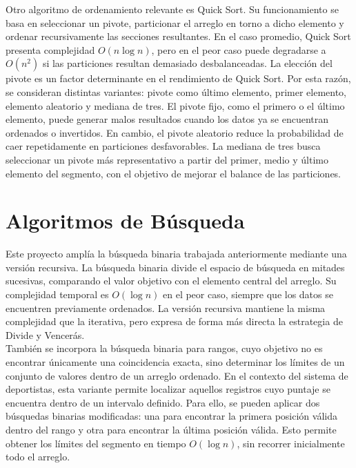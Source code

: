 Otro algoritmo de ordenamiento relevante es Quick Sort. Su funcionamiento se basa en seleccionar un pivote, particionar el arreglo en torno a dicho elemento y ordenar recursivamente las secciones resultantes. En el caso promedio, Quick Sort presenta complejidad $O(n \log n)$, pero en el peor caso puede degradarse a $O(n^2)$ si las particiones resultan demasiado desbalanceadas. La elección del pivote es un factor determinante en el rendimiento de Quick Sort. Por esta razón, se consideran distintas variantes: pivote como último elemento, primer elemento, elemento aleatorio y mediana de tres. El pivote fijo, como el primero o el último elemento, puede generar malos resultados cuando los datos ya se encuentran ordenados o invertidos. En cambio, el pivote aleatorio reduce la probabilidad de caer repetidamente en particiones desfavorables. La mediana de tres busca seleccionar un pivote más representativo a partir del primer, medio y último elemento del segmento, con el objetivo de mejorar el balance de las particiones. \\

\section{Algoritmos de Búsqueda}

Este proyecto amplía la búsqueda binaria trabajada anteriormente mediante una versión recursiva. La búsqueda binaria divide el espacio de búsqueda en mitades sucesivas, comparando el valor objetivo con el elemento central del arreglo. Su complejidad temporal es $O(\log n)$ en el peor caso, siempre que los datos se encuentren previamente ordenados. La versión recursiva mantiene la misma complejidad que la iterativa, pero expresa de forma más directa la estrategia de Divide y Vencerás. \\

También se incorpora la búsqueda binaria para rangos, cuyo objetivo no es encontrar únicamente una coincidencia exacta, sino determinar los límites de un conjunto de valores dentro de un arreglo ordenado. En el contexto del sistema de deportistas, esta variante permite localizar aquellos registros cuyo puntaje se encuentra dentro de un intervalo definido. Para ello, se pueden aplicar dos búsquedas binarias modificadas: una para encontrar la primera posición válida dentro del rango y otra para encontrar la última posición válida. Esto permite obtener los límites del segmento en tiempo $O(\log n)$, sin recorrer inicialmente todo el arreglo. \\

